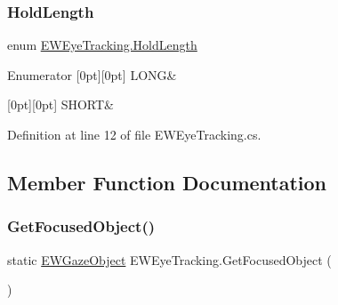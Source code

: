 \subsubsection{\texorpdfstring{Hold\+Length}{HoldLength}}
{\footnotesize\ttfamily enum \mbox{\hyperlink{class_e_w_eye_tracking_a47461bd1b91c6aacca31b57253249392}{E\+W\+Eye\+Tracking.\+Hold\+Length}}\hspace{0.3cm}{\ttfamily [strong]}}

\begin{DoxyEnumFields}{Enumerator}
[0pt][0pt]{}\mbox{\label{class_e_w_eye_tracking_a47461bd1b91c6aacca31b57253249392ac1fabfea54ec6011e694f211f3ffebf3}} 
L\+O\+NG&\\
\hline

[0pt][0pt]{}\mbox{\label{class_e_w_eye_tracking_a47461bd1b91c6aacca31b57253249392aa35c2b02966b1563e5bf7b81b8b0cf77}} 
S\+H\+O\+RT&\\
\hline

\end{DoxyEnumFields}


Definition at line 12 of file E\+W\+Eye\+Tracking.\+cs.



\subsection{Member Function Documentation}
\mbox{\label{class_e_w_eye_tracking_a54ec9aa86d22af3b318ea940bc3c01cb}} 
\subsubsection{\texorpdfstring{Get\+Focused\+Object()}{GetFocusedObject()}}
{\footnotesize\ttfamily static \mbox{\hyperlink{class_e_w_gaze_object}{E\+W\+Gaze\+Object}} E\+W\+Eye\+Tracking.\+Get\+Focused\+Object (\begin{DoxyParamCaption}{ }\end{DoxyParamCaption})\hspace{0.3cm}{\ttfamily [static]}}



